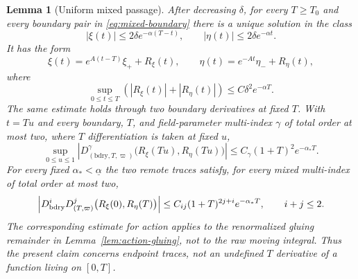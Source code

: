 \documentclass[11pt]{amsart}
\numberwithin{equation}{section}
\newtheorem{lemma}[theorem]{Lemma}
\theoremstyle{definition}
\theoremstyle{remark}
\begin{document}
\begin{lemma}[Uniform mixed passage]\label{lem:mixed-passage}
After decreasing $\delta$, for every $T\ge T_0$ and every boundary pair
in \eqref{eq:mixed-boundary} there is a unique solution in the class
\begin{equation}\label{eq:mixed-class}
 |\xi(t)|\le2\delta e^{-\alpha(T-t)},\qquad
 |\eta(t)|\le2\delta e^{-\alpha t}.
\end{equation}
It has the form
\begin{equation}\label{eq:mixed-expansion}
 \xi(t)=e^{A(t-T)}\xi_++R_\xi(t),\qquad
 \eta(t)=e^{-At}\eta_-+R_\eta(t),
\end{equation}
where
\begin{equation}\label{eq:mixed-error}
 \sup_{0\le t\le T}(|R_\xi(t)|+|R_\eta(t)|)
 \le C\delta^2e^{-\alpha T}.
\end{equation}
The same estimate holds through two boundary derivatives at fixed $T$.
With $t=Tu$ and every boundary, $T$, and field-parameter multi-index
$\gamma$ of total order at most two, where $T$ differentiation is taken at
fixed $u$,
\begin{equation}\label{eq:mixed-interior-jets}
 \sup_{0\le u\le1}
 \left|D_{(\mathrm{bdry},T,\varpi)}^\gamma
   \bigl(R_\xi(Tu),R_\eta(Tu)\bigr)\right|
 \le C_\gamma(1+T)^2e^{-\alpha_*T}.
\end{equation}
For every fixed $\alpha_*<\underline\alpha$ the two remote traces
satisfy, for every mixed multi-index of total order at most two,
\begin{equation}\label{eq:mixed-trace-jets}
 \left|D_{\rm bdry}^iD_{(T,\varpi)}^j
   \bigl(R_\xi(0),R_\eta(T)\bigr)\right|
 \le C_{ij}(1+T)^{2j+i}e^{-\alpha_*T},
 \qquad i+j\le2.
\end{equation}
The corresponding estimate for action applies to the \emph{renormalized
gluing remainder} in Lemma~\ref{lem:action-gluing}, not to the raw moving
integral.  Thus the present claim concerns endpoint traces, not an
undefined $T$ derivative of a function living on $[0,T]$.
\end{lemma}
\end{document}
